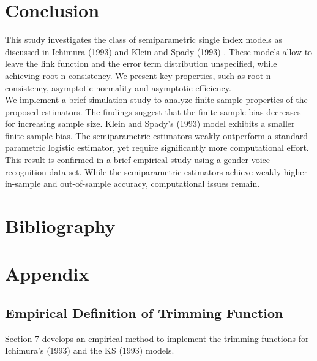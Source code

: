 \documentclass[a4paper]{article}
\begin{document}
\section{Conclusion} %
\label{sec:Conclusion}

This study investigates the class of semiparametric single index models as discussed in Ichimura (1993) \cite{[6]} and Klein and Spady (1993) \cite{[12]}. These models allow to leave the link function and the error term distribution unspecified, while achieving root-n consistency. We present key properties, such as root-n consistency, asymptotic normality and asymptotic efficiency.\\
We implement a brief simulation study to analyze finite sample properties of the proposed estimators. The findings suggest that the finite sample bias decreases for increasing sample size. Klein and Spady's (1993) \cite{[12]} model exhibits a smaller finite sample bias. The semiparametric estimators weakly outperform a standard parametric logistic estimator, yet require significantly more computational effort.\\
This result is confirmed in a brief empirical study using a gender voice recognition data set. While the semiparametric estimators achieve weakly higher in-sample and out-of-sample accuracy, computational issues remain.\\



\newpage 



\section{Bibliography} %
\label{sec:Bibliography}


\nocite{*}
\printbibliography[heading=none]

\newpage 

\section{Appendix}
\label{sec:appendix}


\subsection{Empirical Definition of Trimming Function}
Section 7 develops an empirical method to implement the trimming functions for Ichimura's (1993) \cite{[6]} and the KS (1993) \cite{[12]} models.
\end{document}
